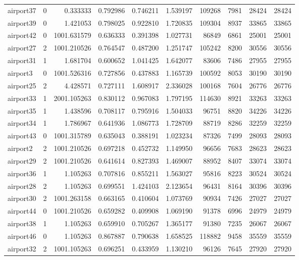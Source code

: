 \begin{longtable}{|l|r|r|r|r|r|r|r|r|r|}
airport37 & 0 & 0.333333 & 0.792986 & 0.746211 & 1.539197 & 109268 & 7981 & 28424 & 28424 \\
airport39 & 0 & 1.421053 & 0.798025 & 0.922810 & 1.720835 & 109304 & 8937 & 33865 & 33865 \\
airport42 & 0 & 1001.631579 & 0.636333 & 0.391398 & 1.027731 & 86849 & 6861 & 25001 & 25001 \\
airport27 & 2 & 1001.210526 & 0.764547 & 0.487200 & 1.251747 & 105242 & 8200 & 30556 & 30556 \\
airport31 & 1 & 1.681704 & 0.600652 & 1.041425 & 1.642077 & 83606 & 7486 & 27955 & 27955 \\
airport3 & 0 & 1001.526316 & 0.727856 & 0.437883 & 1.165739 & 100592 & 8053 & 30190 & 30190 \\
airport25 & 2 & 4.428571 & 0.727111 & 1.608917 & 2.336028 & 100168 & 7604 & 26776 & 26776 \\
airport33 & 1 & 2001.105263 & 0.830112 & 0.967083 & 1.797195 & 114630 & 8921 & 33263 & 33263 \\
airport35 & 1 & 1.438596 & 0.708117 & 0.795916 & 1.504033 & 96751 & 8820 & 34226 & 34226 \\
airport34 & 1 & 1.786967 & 0.641936 & 1.086773 & 1.728709 & 88719 & 8286 & 32259 & 32259 \\
airport43 & 0 & 1001.315789 & 0.635043 & 0.388191 & 1.023234 & 87326 & 7499 & 28093 & 28093 \\
airport2 & 2 & 1001.210526 & 0.697218 & 0.452732 & 1.149950 & 96656 & 7683 & 28623 & 28623 \\
airport29 & 2 & 1001.210526 & 0.641614 & 0.827393 & 1.469007 & 88952 & 8407 & 33074 & 33074 \\
airport36 & 1 & 1.105263 & 0.707816 & 0.855211 & 1.563027 & 95816 & 8223 & 30524 & 30524 \\
airport28 & 2 & 1.105263 & 0.699551 & 1.424103 & 2.123654 & 96431 & 8164 & 30396 & 30396 \\
airport30 & 2 & 1001.263158 & 0.663165 & 0.410604 & 1.073769 & 90934 & 7426 & 27027 & 27027 \\
airport44 & 0 & 1001.210526 & 0.659282 & 0.409908 & 1.069190 & 91378 & 6996 & 24979 & 24979 \\
airport38 & 1 & 1.105263 & 0.659910 & 0.705267 & 1.365177 & 91380 & 7235 & 26067 & 26067 \\
airport46 & 0 & 1.105263 & 0.867887 & 0.790638 & 1.658525 & 118882 & 9458 & 35559 & 35559 \\
airport32 & 2 & 1001.105263 & 0.696251 & 0.433959 & 1.130210 & 96126 & 7645 & 27920 & 27920 \\

\end{longtable}

